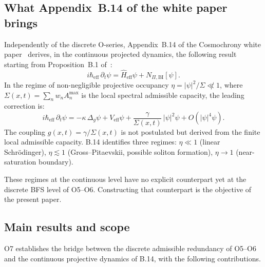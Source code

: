 \documentclass[11pt,a4paper]{article}
\theoremstyle{definition}
\theoremstyle{remark}
\newcommand{\heff}{\hbar_{\mathrm{eff}}}
\newcommand{\Heff}{\hat{H}_{\mathrm{eff}}}
\begin{document}
  \subsection{What Appendix~B.14 of the white paper brings}
  \label{ssec:b14}

  Independently of the discrete O-series, Appendix~B.14 of the Cosmochrony white
  paper~\cite{Cosmochrony} derives, in the continuous projected dynamics, the following
  result starting from Proposition~B.1 of~\cite{Cosmochrony}:
  \begin{equation}
    \label{eq:schrodinger-eff}
    i\heff\,\partial_t\psi = \Heff\psi + N_{\Pi,\mathrm{BI}}[\psi].
  \end{equation}
  In the regime of non-negligible projective occupancy $\eta = |\psi|^2/\Sigma \not\ll 1$,
  where $\Sigma(x,t) = \sum_n w_n A_n^{\max}$ is the local spectral admissible capacity,
  the leading correction is:
  \begin{equation}
    \label{eq:GP}
    i\heff\,\partial_t\psi
    = -\kappa\,\Delta_g\psi + V_{\mathrm{eff}}\psi
    + \frac{\gamma}{\Sigma(x,t)}\,|\psi|^2\psi + O(|\psi|^4\psi).
  \end{equation}
  The coupling $g(x,t) = \gamma/\Sigma(x,t)$ is not postulated but derived from the finite local
  admissible capacity.
  B.14 identifies three regimes: $\eta \ll 1$ (linear Schr\"{o}dinger), $\eta \lesssim 1$
  (Gross--Pitaevskii, possible soliton formation), $\eta \to 1$ (near-saturation boundary).

  These regimes at the continuous level have no explicit counterpart yet at the discrete BFS
  level of O5--O6.
  Constructing that counterpart is the objective of the present paper.

  \subsection{Main results and scope}
  \label{ssec:results}

  O7 establishes the bridge between the discrete admissible redundancy of O5--O6 and the
  continuous projective dynamics of B.14, with the following contributions.
\end{document}
